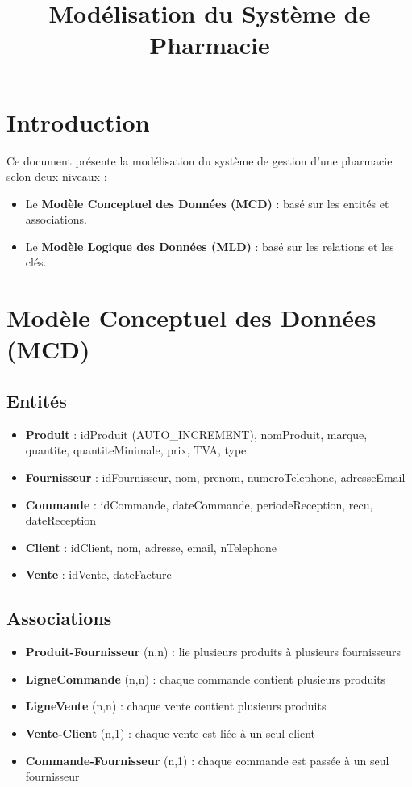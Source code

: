 \documentclass[12pt]{article}
\title{\textbf{Modélisation du Système de Pharmacie}}
\begin{document}
\maketitle

\section*{Introduction}
Ce document présente la modélisation du système de gestion d'une pharmacie selon deux niveaux :
\begin{itemize}
  \item Le \textbf{Modèle Conceptuel des Données (MCD)} : basé sur les entités et associations.
  \item Le \textbf{Modèle Logique des Données (MLD)} : basé sur les relations et les clés.
\end{itemize}

\section{Modèle Conceptuel des Données (MCD)}

\subsection*{Entités}
\begin{itemize}
  \item \textbf{Produit} : idProduit (AUTO\_INCREMENT), nomProduit, marque, quantite, quantiteMinimale, prix, TVA, type
  \item \textbf{Fournisseur} : idFournisseur, nom, prenom, numeroTelephone, adresseEmail
  \item \textbf{Commande} : idCommande, dateCommande, periodeReception, recu, dateReception
  \item \textbf{Client} : idClient, nom, adresse, email, nTelephone
  \item \textbf{Vente} : idVente, dateFacture
\end{itemize}

\subsection*{Associations}
\begin{itemize}
  \item \textbf{Produit-Fournisseur} (n,n) : lie plusieurs produits à plusieurs fournisseurs
  \item \textbf{LigneCommande} (n,n) : chaque commande contient plusieurs produits
  \item \textbf{LigneVente} (n,n) : chaque vente contient plusieurs produits
  \item \textbf{Vente-Client} (n,1) : chaque vente est liée à un seul client
  \item \textbf{Commande-Fournisseur} (n,1) : chaque commande est passée à un seul fournisseur

\end{itemize}
\end{document}

